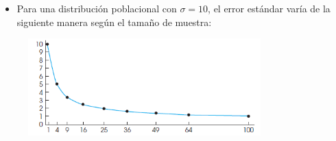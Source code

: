 \documentclass{beamer}
\begin{document}
\begin{frame}
	\begin{itemize}
\justifying
\item Para una distribución poblacional con $\sigma=10$, el error estándar varía de la siguiente manera según el tamaño de muestra:
	\end{itemize}
	\begin{figure}[H]
		\centering  
		\caption{} 
		\includegraphics[width = 0.8\textwidth]{./cap1}
	\end{figure}
\end{frame}
\end{document}
